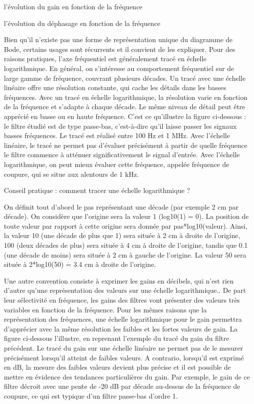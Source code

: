 \documentclass[]{article}
\begin{document}
l'évolution du gain en fonction de la fréquence

l'évolution du déphasage en fonction de la fréquence

Bien qu'il n'existe pas une forme de représentation unique du diagramme
de Bode, certains usages sont récurrents et il convient de les
expliquer. Pour des raisons pratiques, l'axe fréquentiel est
généralement tracé en échelle logarithmique. En général, on s'intéresse
au comportement fréquentiel sur de large gamme de fréquence, couvrant
plusieurs décades. Un tracé avec une échelle linéaire offre une
résolution constante, qui cache les détails dans les basses fréquences.
Avec un tracé en échelle logarithmique, la résolution varie en fonction
de la fréquence et s'adapte à chaque décade. Le même niveau de détail
peut être apprécié en basse ou en haute fréquence. C'est ce qu'illustre
la figure ci-dessous : le filtre étudié est de type passe-bas,
c'est-à-dire qu'il laisse passer les signaux basses fréquences. Le tracé
est réalisé entre 100 Hz et 1 MHz. Avec l'échelle linéaire, le tracé ne
permet pas d'évaluer précisément à partir de quelle fréquence le filtre
commence à atténuer significativement le signal d'entrée. Avec l'échelle
logarithmique, on peut mieux évaluer cette fréquence, appelée fréquence
de coupure, qui se situe aux alentours de 1 kHz.

Conseil pratique : comment tracer une échelle logarithmique ?

On définit tout d'abord le pas représentant une décade (par exemple 2 cm
par décade). On considère que l'origine sera la valeur 1 (log10(1) = 0).
La position de toute valeur par rapport à cette origine sera donnée par
pas*log10(valeur). Ainsi, la valeur 10 (une décade de plus que 1) sera
située à 2 cm à droite de l'origine, 100 (deux décades de plus) sera
située à 4 cm à droite de l'origine, tandis que 0.1 (une décade de
moins) sera située à 2 cm à gauche de l'origine. La valeur 50 sera
située à 2*log10(50) = 3.4 cm à droite de l'origine.

Une autre convention consiste à exprimer les gains en décibels, qui
n'est rien d'autre qu'une représentation des valeurs sur une échelle
logarithmique.. De part leur sélectivité en fréquence, les gains des
filtres vont présenter des valeurs très variables en fonction de la
fréquence. Pour les mêmes raisons que la représentation des fréquences,
une échelle logarithmique pour le gain permettra d'apprécier avec la
même résolution les faibles et les fortes valeurs de gain. La figure
ci-dessous l'illustre, en reprenant l'exemple du tracé du gain du filtre
précédent. Le tracé du gain sur une échelle linéaire ne permet pas de le
mesurer précisément lorsqu'il atteint de faibles valeurs. A contrario,
lorsqu'il est exprimé en dB, la mesure des faibles valeurs devient plus
précise et il est possible de mettre en évidence des tendances
particulières du gain. Par exemple, le gain de ce filtre décroit avec
une pente de -20 dB par décade au-dessus de la fréquence de coupure, ce
qui est typique d'un filtre passe-bas d'ordre 1. ~
\end{document}
